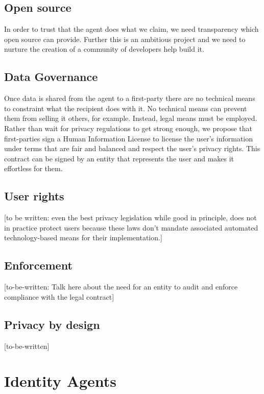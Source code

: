 \documentclass[11pt, oneside]{article}   	%
\begin{document}
\subsection{Open source}

In order to trust that the agent does what we claim, we need transparency which open source can provide. Further this is an ambitious project and we need to nurture the creation of a community of developers help build it.

\subsection{Data Governance}

Once data is shared from the agent to a first-party there are no technical means to constraint what the recipient does with it. No technical means can prevent them from selling it others, for example. Instead, legal means must be employed. Rather than wait for privacy regulations to get strong enough, we propose that first-parties sign a Human Information License to license the user's information under terms that are fair and balanced and respect the user's privacy rights. This contract can be signed by an entity that represents the user and makes it effortless for them.

\subsection{User rights}

[to be written: even the best privacy legislation while good in principle, does not in practice protect users because these laws don't mandate associated automated technology-based means for their implementation.]

\subsection{Enforcement}

[to-be-written: Talk here about the need for an entity to audit and enforce compliance with the legal contract]

\subsection{Privacy by design}
[to-be-written]

\section{Identity Agents} %
\end{document}
